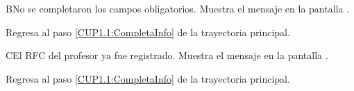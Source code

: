 \begin{UCtrayectoriaA}{B}{No se completaron los campos obligatorios.}
	\UCpaso [\UCsist] Muestra el mensaje  en la pantalla .
	
	\UCpaso Regresa al paso \ref{CUP1.1:CompletaInfo} de la trayectoria principal.
\end{UCtrayectoriaA}

\begin{UCtrayectoriaA}{C}{El RFC del profesor ya fue registrado.}
	\UCpaso [\UCsist] Muestra el mensaje  en la pantalla .
	
	\UCpaso Regresa al paso \ref{CUP1.1:CompletaInfo} de la trayectoria principal.
\end{UCtrayectoriaA}
